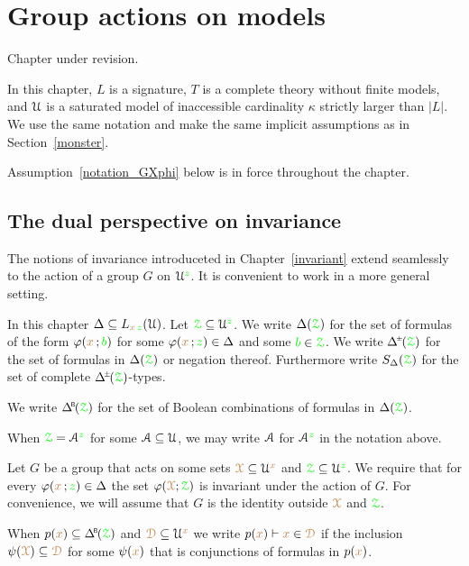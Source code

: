 \chapter{Group actions on models}
\label{actions}

\def\medrel#1{\parbox[t]{5ex}{$\displaystyle\hfil #1$}}
\def\ceq#1#2#3{\parbox[t]{17ex}{$\displaystyle #1$}\medrel{#2}{$\displaystyle #3$}}

\noindent\llap{\textcolor{red}{\Large\warning}\kern1.5ex}\ignorespaces
Chapter under revision.

In this chapter, $L$ is a signature, $T$ is a complete theory without finite models, and $\EuScript U$ is a saturated model of inaccessible cardinality $\kappa$ strictly larger than $|L|$.
We use the same notation and make the same implicit assumptions as in Section~\ref{monster}.

Assumption~\ref{notation_GXphi} below is in force throughout the chapter. 

\section{The dual perspective on invariance}\label{dual_perspective}

The notions of invariance introduceted in Chapter~\ref{invariant} extend seamlessly to the action of a group $G$ on $\EuScript U^{\color{green} z}$.
It is convenient to work in a more general setting.

In this chapter $\Delta\subseteq L_{{\color{brown} x}\,{\color{green} z}}(\EuScript U)$.
Let ${\color{green}\EuScript Z}\subseteq\EuScript U^{\color{green} z}$.
We write \emph{$\Delta({\color{green}\EuScript Z})$} for the set of formulas of the form $\varphi({\color{brown} x}\,;{\color{green} b})$ for some $\varphi({\color{brown} x}\,;{\color{green} z})\in\Delta$ and some ${\color{green} b}\in{\color{green}\EuScript Z}$.
We write \emph{$\pmDelta(\grZ)$} for the set of formulas in $\Delta({\color{green}\EuScript Z})$ or negation thereof.
Furthermore write $S_\Delta({\color{green}\EuScript Z})$ for the set of complete $\pmDelta(\grZ)$-types.

We write \emph{$\BDelta(\grZ)$} for the set of Boolean combinations of formulas in $\Delta({\color{green}\EuScript Z})$.

When ${\color{green}\EuScript Z}=\EuScript A^{\color{green} z}$ for some $\EuScript A\subseteq\EuScript U$, we may write $\EuScript A$ for $\EuScript A^{\color{green} z}$ in the notation above.

\begin{assumption}\label{notation_GXphi}
  Let $G$ be a group that acts on some sets ${{\color{brown}\EuScript X}}\subseteq\EuScript U^{\color{brown} x}$ and ${{\color{green}\EuScript Z}}\subseteq\EuScript U^{\color{green} z}$.
  We require that for every $\varphi({\color{brown} x}\,;{\color{green} z})\in\Delta$ the set $\varphi({\color{brown}\EuScript X};{\color{green}\EuScript Z})$ is invariant under the action of $G$.
  For convenience, we will assume that $G$ is the identity outside ${{\color{brown}\EuScript X}}$ and ${{\color{green}\EuScript Z}}$.

  When $p({\mr x})\subseteq\BDelta(\grZ)$ and  ${{\color{brown}\EuScript D}}\subseteq\EuScript U^{\color{brown} x}$ we write $p({\color{brown} x})\vdash{\color{brown}x}\in{{\color{brown}\EuScript D}}$ if the inclusion $\psi({\color{brown}\EuScript X})\subseteq{{\color{brown}\EuScript D}}$ for some $\psi({\color{brown} x})$ that is conjunctions of formulas in $p({\color{brown} x})$.
\end{assumption}

